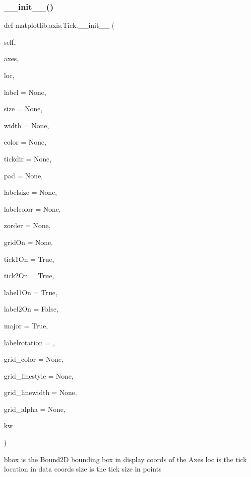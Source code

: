 \subsubsection{\texorpdfstring{\+\_\+\+\_\+init\+\_\+\+\_\+()}{\_\_init\_\_()}}
{\footnotesize\ttfamily def matplotlib.\+axis.\+Tick.\+\_\+\+\_\+init\+\_\+\+\_\+ (\begin{DoxyParamCaption}\item[{}]{self,  }\item[{}]{axes,  }\item[{}]{loc,  }\item[{}]{label = {\ttfamily None},  }\item[{}]{size = {\ttfamily None},  }\item[{}]{width = {\ttfamily None},  }\item[{}]{color = {\ttfamily None},  }\item[{}]{tickdir = {\ttfamily None},  }\item[{}]{pad = {\ttfamily None},  }\item[{}]{labelsize = {\ttfamily None},  }\item[{}]{labelcolor = {\ttfamily None},  }\item[{}]{zorder = {\ttfamily None},  }\item[{}]{grid\+On = {\ttfamily None},  }\item[{}]{tick1\+On = {\ttfamily True},  }\item[{}]{tick2\+On = {\ttfamily True},  }\item[{}]{label1\+On = {\ttfamily True},  }\item[{}]{label2\+On = {\ttfamily False},  }\item[{}]{major = {\ttfamily True},  }\item[{}]{labelrotation = {},  }\item[{}]{grid\+\_\+color = {\ttfamily None},  }\item[{}]{grid\+\_\+linestyle = {\ttfamily None},  }\item[{}]{grid\+\_\+linewidth = {\ttfamily None},  }\item[{}]{grid\+\_\+alpha = {\ttfamily None},  }\item[{}]{kw }\end{DoxyParamCaption})}

\begin{DoxyVerb}bbox is the Bound2D bounding box in display coords of the Axes
loc is the tick location in data coords
size is the tick size in points
\end{DoxyVerb}
 

